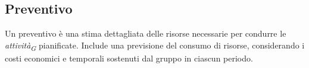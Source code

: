 \subsection{Preventivo}
Un preventivo è una stima dettagliata delle risorse necessarie per condurre le \textit{attività}\textsubscript{\textit{G}} pianificate. Include una previsione del consumo di risorse, considerando i costi economici e temporali sostenuti dal gruppo in ciascun periodo.